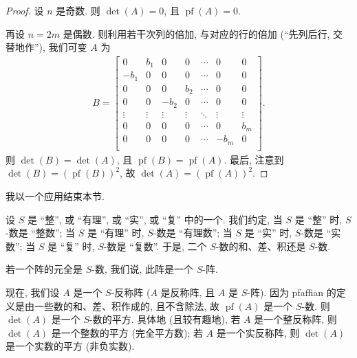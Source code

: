 \begin{proof}
    设 \(n\) 是奇数.
    则 \(\det {(A)} = 0\),
    且 \(\operatorname{pf} {(A)} = 0\).

    再设 \(n = 2m\) 是偶数.
    则利用若干次列的倍加, 与对应的行的倍加
    (``先列后行, 交替地作''),
    我们可变 \(A\) 为
    \begin{align*}
        B =
        \begin{bmatrix}
            0      & b_1    & 0      & 0      & \cdots & 0      & 0      \\
            -b_1   & 0      & 0      & 0      & \cdots & 0      & 0      \\
            0      & 0      & 0      & b_2    & \cdots & 0      & 0      \\
            0      & 0      & -b_2   & 0      & \cdots & 0      & 0      \\
            \vdots & \vdots & \vdots & \vdots & \ddots & \vdots & \vdots \\
            0      & 0      & 0      & 0      & \cdots & 0      & b_m    \\
            0      & 0      & 0      & 0      & \cdots & -b_m   & 0      \\
        \end{bmatrix}.
    \end{align*}
    则 \(\det {(B)} = \det {(A)}\),
    且 \(\operatorname{pf} {(B)} = \operatorname{pf} {(A)}\).
    最后, 注意到 \(\det {(B)}
    = (\operatorname{pf} {(B)})^2\),
    故 \(\det {(A)}
    = (\operatorname{pf} {(A)})^2\).
\end{proof}

我以一个应用结束本节.

设 \(S\) 是 ``整'', 或 ``有理'', 或 ``实'', 或 ``复'' 中的一个.
我们约定,
当 \(S\) 是 ``整'' 时, \(S\)-数是 ``整数'';
当 \(S\) 是 ``有理'' 时, \(S\)-数是 ``有理数'';
当 \(S\) 是 ``实'' 时, \(S\)-数是 ``实数'';
当 \(S\) 是 ``复'' 时, \(S\)-数是 ``复数''.
于是, 二个 \(S\)-数的和、差、积还是 \(S\)-数.

若一个阵的元全是 \(S\)-数,
我们说, 此阵是一个 \(S\)-阵.

现在, 我们设 \(A\) 是一个 \(S\)-反称阵
(\(A\) 是反称阵, 且 \(A\) 是 \(S\)-阵).
因为 pfaffian 的定义是由一些数的和、差、积作成的,
且不含除法,
故 \(\operatorname{pf} {(A)}\) 是一个 \(S\)-数.
则 \(\det {(A)}\) 是一个 \(S\)-数的平方.
具体地 (且较有趣地),
若 \(A\) 是一个整反称阵, 则 \(\det {(A)}\) 是一个整数的平方
(完全平方数);
若 \(A\) 是一个实反称阵, 则 \(\det {(A)}\) 是一个实数的平方
(非负实数).

